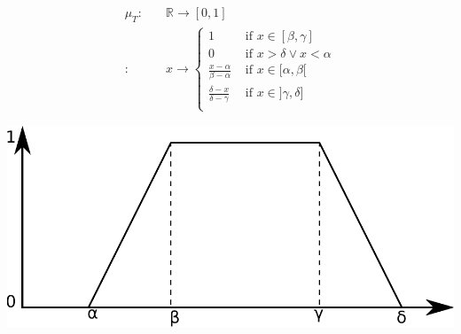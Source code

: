 
\begin{align}
\mu_T : & \quad \mathbb{R} \rightarrow \left[0,1\right] \\
\nonumber
 : & \quad x \rightarrow
\begin{cases}
1 & \mbox{ if } x \in [\beta,\gamma] \\
0 & \mbox{ if } x > \delta \vee x < \alpha \\
\frac{x-\alpha}{\beta - \alpha} & \mbox{ if } x \in [\alpha,\beta[ \\
\frac{\delta -x}{\delta - \gamma} & \mbox{ if } x \in ]\gamma,\delta] \\
\end{cases}
\end{align}

\begin{samepage}
\vspace*{13pt}
\begin{center}
{
\includegraphics[scale=0.25]{./graphs/trapezoidalDistribution.pdf}

}
\end{center}
\vspace*{10pt}
\vspace*{13pt}
\end{samepage}

%  


